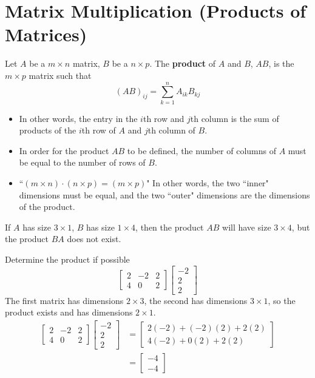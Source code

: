 \documentclass[letterpaper,12pt]{article}
\begin{document}
\section*{Matrix Multiplication (Products of Matrices)}
\begin{definition}
Let $A$ be a $m \times n$ matrix, $B$ be a $n \times p$. The \textbf{product} of $A$ and $B$, $AB$, is the $m \times p$ matrix such that
\begin{equation*}
    (AB)_{ij} = \sum_{k=1}^n A_{ik} B_{kj}
\end{equation*}
\begin{itemize}
    \item In other words, the entry in the $i$th row and $j$th column is the sum of products of the $i$th row of $A$ and $j$th column of $B$.
    \item In order for the product $AB$ to be defined, the number of columns of $A$ must be equal to the number of rows of $B$.
    \item ``$(m \times n) \cdot (n \times p) = (m \times p)$" In other words, the two ``inner" dimensions must be equal, and the two ``outer" dimensions are the dimensions of the product.
\end{itemize}
\end{definition}

\begin{example}
If $A$ has size $3 \times 1$, $B$ has size $1 \times 4$, then the product $AB$ will have size $3 \times 4$, but the product $BA$ does not exist.
\end{example}

\begin{example}
Determine the product if possible
\begin{equation*}
    \begin{bmatrix} 2 & -2 & 2 \\ 4 & 0 & 2 \end{bmatrix} \begin{bmatrix} -2 \\ 2 \\ 2 \end{bmatrix}
\end{equation*}
The first matrix has dimensions $2 \times 3$, the second has dimensions $3 \times 1$, so the product exists and has dimensions $2 \times 1$.
\begin{align*}
    \begin{bmatrix} 2 & -2 & 2 \\ 4 & 0 & 2 \end{bmatrix} \begin{bmatrix} -2 \\ 2 \\ 2 \end{bmatrix} & = \begin{bmatrix} 2(-2) + (-2)(2) + 2(2) \\ 4(-2) + 0(2) + 2(2) \end{bmatrix} \\
    & = \begin{bmatrix} -4 \\ -4 \end{bmatrix}
\end{align*}
\end{example}
\end{document}
